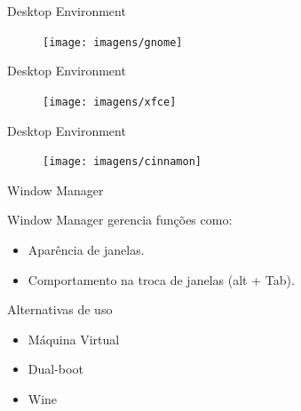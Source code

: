 \documentclass[size=14pt,
style=paintings
]{powerdot}
\newenvironment{vslide}{\vspace{\stretch{1}}}{\vspace{\stretch{1}}}
\begin{document}
\begin{slide}{Desktop Environment}
  \centering
   \begin{figure}[!h]
  \texttt{[image: imagens/gnome]}
   \end{figure}
\end{slide}

\begin{slide}{Desktop Environment}
  \centering
   \begin{figure}[!h]
  \texttt{[image: imagens/xfce]}
   \end{figure}
\end{slide}

\begin{slide}{Desktop Environment}
  \centering
   \begin{figure}[!h]
  \texttt{[image: imagens/cinnamon]}
   \end{figure}
\end{slide}

\begin{slide}{Window Manager}
\begin{vslide}

Window Manager gerencia funções como:

\begin{itemize}
\item Aparência de janelas.
\item Comportamento na troca de janelas (alt + Tab).
\end{itemize}

\end{vslide}
\end{slide}

\begin{slide}{Alternativas de uso}
\begin{vslide}

\begin{itemize}
\item Máquina Virtual
\item Dual-boot
\item Wine
\end{itemize}

\end{vslide}
\end{slide}
\end{document}
